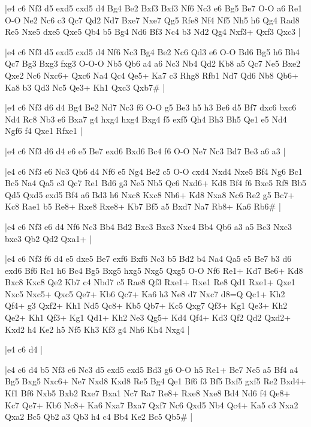 \whitename{}
\blackname{}
\makegametitle
|e4 c6 Nf3 d5 exd5 cxd5 d4 Bg4 Be2 Bxf3 Bxf3 Nf6 Nc3 e6 Bg5 Be7 O-O a6 Re1 O-O Ne2 Nc6 c3 Qc7 Qd2 Nd7 Bxe7 Nxe7 Qg5 Rfe8 Nf4 Nf5 Nh5 h6 Qg4 Rad8 Re5 Nxe5 dxe5 Qxe5 Qb4 b5 Bg4 Nd6 Bf3 Nc4 b3 Nd2 Qg4 Nxf3+ Qxf3 Qxc3  |

\whitename{}
\blackname{}
\makegametitle
|e4 c6 Nf3 d5 exd5 cxd5 d4 Nf6 Nc3 Bg4 Be2 Nc6 Qd3 e6 O-O Bd6 Bg5 h6 Bh4 Qc7 Bg3 Bxg3 fxg3 O-O-O Nb5 Qb6 a4 a6 Nc3 Nb4 Qd2 Kb8 a5 Qc7 Ne5 Bxe2 Qxe2 Nc6 Nxc6+ Qxc6 Na4 Qc4 Qe5+ Ka7 c3 Rhg8 Rfb1 Nd7 Qd6 Nb8 Qb6+ Ka8 b3 Qd3 Nc5 Qe3+ Kh1 Qxc3 Qxb7\#  |

\whitename{}
\blackname{}
\makegametitle
|e4 c6 Nf3 d6 d4 Bg4 Be2 Nd7 Nc3 f6 O-O g5 Be3 h5 h3 Be6 d5 Bf7 dxc6 bxc6 Nd4 Rc8 Nb3 e6 Bxa7 g4 hxg4 hxg4 Bxg4 f5 exf5 Qh4 Bh3 Bh5 Qe1 e5 Nd4 Ngf6 f4 Qxe1 Rfxe1  |

\whitename{}
\blackname{}
\makegametitle
|e4 c6 Nf3 d6 d4 e6 e5 Be7 exd6 Bxd6 Bc4 f6 O-O Ne7 Nc3 Bd7 Be3 a6 a3  |

\whitename{}
\blackname{}
\makegametitle
|e4 c6 Nf3 e6 Nc3 Qb6 d4 Nf6 e5 Ng4 Be2 c5 O-O cxd4 Nxd4 Nxe5 Bf4 Ng6 Bc1 Bc5 Na4 Qa5 c3 Qc7 Re1 Bd6 g3 Ne5 Nb5 Qc6 Nxd6+ Kd8 Bf4 f6 Bxe5 Rf8 Bb5 Qd5 Qxd5 exd5 Bf4 a6 Bd3 h6 Nxc8 Kxc8 Nb6+ Kd8 Nxa8 Nc6 Re2 g5 Bc7+ Kc8 Rae1 b5 Re8+ Rxe8 Rxe8+ Kb7 Bf5 a5 Bxd7 Na7 Rb8+ Ka6 Rb6\#  |

\whitename{}
\blackname{}
\makegametitle
|e4 c6 Nf3 e6 d4 Nf6 Nc3 Bb4 Bd2 Bxc3 Bxc3 Nxe4 Bb4 Qb6 a3 a5 Bc3 Nxc3 bxc3 Qb2 Qd2 Qxa1+  |

\whitename{}
\blackname{}
\makegametitle
|e4 c6 Nf3 f6 d4 e5 dxe5 Be7 exf6 Bxf6 Nc3 b5 Bd2 b4 Na4 Qa5 e5 Be7 b3 d6 exd6 Bf6 Rc1 h6 Bc4 Bg5 Bxg5 hxg5 Nxg5 Qxg5 O-O Nf6 Re1+ Kd7 Be6+ Kd8 Bxc8 Kxc8 Qe2 Kb7 c4 Nbd7 c5 Rae8 Qf3 Rxe1+ Rxe1 Re8 Qd1 Rxe1+ Qxe1 Nxc5 Nxc5+ Qxc5 Qe7+ Kb6 Qc7+ Ka6 h3 Ne8 d7 Nxc7 d8=Q Qc1+ Kh2 Qf4+ g3 Qxf2+ Kh1 Nd5 Qc8+ Kb5 Qb7+ Kc5 Qxg7 Qf3+ Kg1 Qe3+ Kh2 Qe2+ Kh1 Qf3+ Kg1 Qd1+ Kh2 Ne3 Qg5+ Kd4 Qf4+ Kd3 Qf2 Qd2 Qxd2+ Kxd2 h4 Ke2 h5 Nf5 Kh3 Kf3 g4 Nh6 Kh4 Nxg4  |

\whitename{}
\blackname{}
\makegametitle
|e4 c6 d4  |

\whitename{}
\blackname{}
\makegametitle
|e4 c6 d4 b5 Nf3 e6 Nc3 d5 exd5 exd5 Bd3 g6 O-O h5 Re1+ Be7 Ne5 a5 Bf4 a4 Bg5 Bxg5 Nxc6+ Ne7 Nxd8 Kxd8 Re5 Bg4 Qe1 Bf6 f3 Bf5 Bxf5 gxf5 Re2 Bxd4+ Kf1 Bf6 Nxb5 Bxb2 Rxe7 Bxa1 Nc7 Ra7 Re8+ Rxe8 Nxe8 Bd4 Nd6 f4 Qe8+ Kc7 Qe7+ Kb6 Nc8+ Ka6 Nxa7 Bxa7 Qxf7 Nc6 Qxd5 Nb4 Qc4+ Ka5 c3 Nxa2 Qxa2 Bc5 Qb2 a3 Qb3 h4 c4 Bb4 Ke2 Bc5 Qb5\#  |

